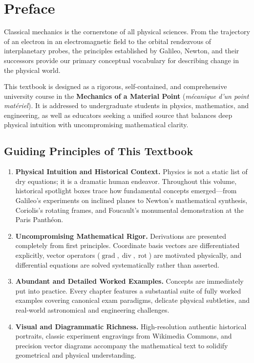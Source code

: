 \documentclass[11pt,oneside,openany]{book}
\DeclareMathOperator{\grad}{grad}
\DeclareMathOperator{\divg}{div}
\DeclareMathOperator{\rot}{rot}
\begin{document}
\frontmatter
\pagestyle{plain}

\chapter*{Preface}

Classical mechanics is the cornerstone of all physical sciences. From the trajectory of an electron in an electromagnetic field to the orbital rendezvous of interplanetary probes, the principles established by Galileo, Newton, and their successors provide our primary conceptual vocabulary for describing change in the physical world.

This textbook is designed as a rigorous, self-contained, and comprehensive university course in the \textbf{Mechanics of a Material Point} (\emph{mécanique d'un point matériel}). It is addressed to undergraduate students in physics, mathematics, and engineering, as well as educators seeking a unified source that balances deep physical intuition with uncompromising mathematical clarity.

\section*{Guiding Principles of This Textbook}

\begin{enumerate}[leftmargin=1.8em,itemsep=5pt]
  \item \textbf{Physical Intuition and Historical Context.} Physics is not a static list of dry equations; it is a dramatic human endeavor. Throughout this volume, historical spotlight boxes trace how fundamental concepts emerged---from Galileo's experiments on inclined planes to Newton's mathematical synthesis, Coriolis's rotating frames, and Foucault's monumental demonstration at the Paris Panthéon.
  \item \textbf{Uncompromising Mathematical Rigor.} Derivations are presented completely from first principles. Coordinate basis vectors are differentiated explicitly, vector operators ($\grad, \divg, \rot$) are motivated physically, and differential equations are solved systematically rather than asserted.
  \item \textbf{Abundant and Detailed Worked Examples.} Concepts are immediately put into practice. Every chapter features a substantial suite of fully worked examples covering canonical exam paradigms, delicate physical subtleties, and real-world astronomical and engineering challenges.
  \item \textbf{Visual and Diagrammatic Richness.} High-resolution authentic historical portraits, classic experiment engravings from Wikimedia Commons, and precision vector diagrams accompany the mathematical text to solidify geometrical and physical understanding.
\end{enumerate}
\end{document}
